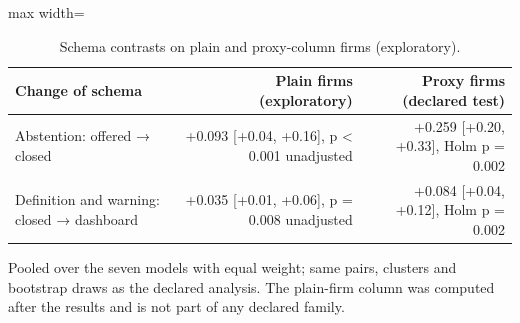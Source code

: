\documentclass[10pt,twocolumn]{article}
\begin{document}
\begin{table}[t]
\centering\footnotesize\setlength{\tabcolsep}{4pt}
\caption{Schema contrasts on plain and proxy-column firms (exploratory).}
\label{tab:21}
\begin{adjustbox}{max width=\textwidth}
\begin{tabular}{lrr}
\toprule
\textbf{Change of schema} & \textbf{Plain firms (exploratory)} & \textbf{Proxy firms (declared test)} \\
\midrule
Abstention: offered → closed & +0.093 [+0.04, +0.16], p < 0.001 unadjusted & +0.259 [+0.20, +0.33], Holm p = 0.002 \\
Definition and warning: closed → dashboard & +0.035 [+0.01, +0.06], p = 0.008 unadjusted & +0.084 [+0.04, +0.12], Holm p = 0.002 \\
\bottomrule
\end{tabular}
\end{adjustbox}
\par\vspace{3pt}\begin{minipage}{\textwidth}\scriptsize Pooled over the seven models with equal weight; same pairs, clusters and bootstrap draws as the declared analysis. The plain-firm column was computed after the results and is not part of any declared family.\end{minipage}
\end{table}
\end{document}
